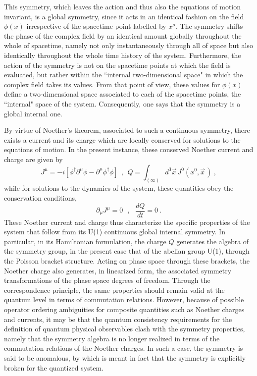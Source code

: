 \documentclass[a4paper,11pt]{article}
\begin{document}
This symmetry, which leaves the action and thus also the equations of motion
invariant, is a global symmetry, since it acts in an identical fashion on
the field $\phi(x)$ irrespective of the spacetime point labelled by $x^\mu$.
The symmetry shifts the phase of the complex field by an identical amount
globally throughout the whole of spacetime, namely not only instantaneously
through all of space but also identically throughout the whole time history
of the system. Furthermore, the action of the symmetry is not on the spacetime
points at which the field is evaluated, but rather within the ``internal 
two-dimensional space" in which the complex field takes its values. From
that point of view, these values for $\phi(x)$ define a two-dimensional
space associated to each of the spacetime points, the ``internal" space of 
the system. Consequently, one says that the symmetry is a global internal one.

By virtue of Noether's theorem, associated to such a continuous symmetry,
there exists a current and its charge which are locally conserved for
solutions to the equations of motion. In the present instance, these conserved
Noether current and charge are given by
\begin{equation}
J^\mu=-i\left[\phi^\dagger\partial^\mu\phi-
\partial^\mu\phi^\dagger\phi\right]\ \ ,\ \ 
Q=\int_{(\infty)}d^3\vec{x}\,J^0(x^0,\vec{x}\,)\ ,
\end{equation}
while for solutions to the dynamics of the system, these quantities
obey the conservation conditions,
\begin{equation}
\partial_\mu J^\mu=0\ \ \ ,\ \ \ \frac{dQ}{dt}=0\ .
\end{equation}
These Noether current and charge thus characterize the specific properties 
of the system that follow from its U(1) continuous global internal symmetry. 
In particular, in its Hamiltonian formulation, the charge $Q$ generates 
the algebra of the symmetry group, in the present case that of the abelian 
group U(1), through the Poisson bracket structure. Acting on phase space 
through these brackets, the Noether charge also generates, in linearized 
form, the associated symmetry transformations of the phase space degrees of 
freedom. Through the correspondence principle, the same properties should 
remain valid at the quantum level in terms of commutation relations. However, 
because of possible operator ordering ambiguities for composite quantities 
such as Noether charges and currents, it may be that the quantum consistency 
requirements for the definition of quantum physical observables clash with the
symmetry properties, namely that the symmetry algebra is no longer
realized in terms of the commutation relations of the Noether charges.
In such a case, the symmetry is said to be anomalous, by which is meant in
fact that the symmetry is explicitly broken for the quantized system.
\end{document}
